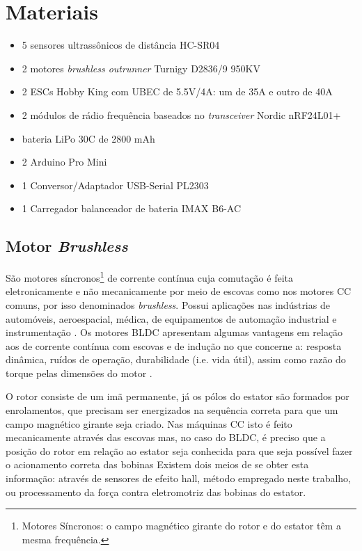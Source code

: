 \chapter{Materiais}
\begin{itemize} %
 \item 5 sensores ultrassônicos de distância HC-SR04
 \item 2 motores \textit{brushless outrunner} Turnigy D2836/9 950KV
 \item 2 ESCs Hobby King com UBEC de 5.5V/4A: um de 35A e outro de 40A 
 \item 2 módulos de rádio frequência baseados no \textit{transceiver} Nordic nRF24L01+ 
 \item bateria LiPo 30C de 2800 mAh
 \item 2 Arduino Pro Mini
 \item 1 Conversor/Adaptador USB-Serial PL2303
 \item 1 Carregador balanceador de bateria IMAX B6-AC
\end{itemize}

\section{Motor \textit{Brushless}}
São motores síncronos\footnote{Motores Síncronos: o campo magnético girante do rotor e do estator têm a mesma frequência.} de corrente contínua cuja 
comutação é feita eletronicamente e não mecanicamente por meio de escovas como nos motores CC comuns, por isso denominados \textit{brushless}.
Possui aplicações nas indústrias de automóveis, aeroespacial, médica, de equipamentos de automação industrial e instrumentação .
Os motores BLDC apresentam algumas vantagens em relação aos de corrente contínua com escovas e de indução no que concerne a: resposta 
dinâmica, ruídos 
de operação, durabilidade (i.e. vida útil), assim como razão do torque pelas dimensões do motor \cite{motor_2}. 

O rotor consiste de um imã permanente, já os pólos do estator são formados por enrolamentos, que precisam ser energizados na sequência correta 
para que um campo magnético girante seja criado.
Nas máquinas CC isto é feito mecanicamente através das escovas mas, no caso do BLDC, é preciso que a posição do rotor em relação ao estator seja 
conhecida para que seja possível fazer o acionamento correta das bobinas 
Existem dois meios de se obter esta informação: através de sensores de efeito hall, método empregado neste trabalho, ou processamento da força contra 
eletromotriz das bobinas do estator.

